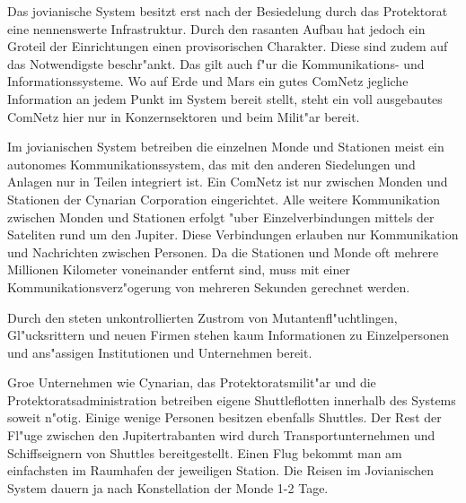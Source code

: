 
Das jovianische System besitzt erst nach der Besiedelung durch das Protektorat eine nennenswerte Infrastruktur. Durch den rasanten Aufbau hat jedoch ein Gro\3teil der Einrichtungen einen provisorischen Charakter. Diese sind zudem auf das Notwendigste beschr"ankt. Das gilt auch f"ur die Kommunikations- und Informationssysteme. Wo auf Erde und Mars ein gutes ComNetz jegliche Information an jedem Punkt im System bereit stellt, steht ein voll ausgebautes ComNetz hier nur in Konzernsektoren und beim Milit"ar bereit.

Im jovianischen System  betreiben die einzelnen Monde und Stationen meist ein autonomes Kommunikationssystem, das mit den anderen Siedelungen und Anlagen nur in Teilen integriert ist. Ein ComNetz ist nur zwischen Monden und Stationen der Cynarian Corporation eingerichtet. Alle weitere Kommunikation zwischen Monden und Stationen erfolgt "uber Einzelverbindungen mittels der Sateliten rund um den Jupiter. Diese Verbindungen erlauben nur Kommunikation und Nachrichten zwischen Personen. Da die Stationen und Monde oft mehrere Millionen Kilometer voneinander entfernt sind, muss mit einer Kommunikationsverz"ogerung von mehreren Sekunden gerechnet werden.

Durch den steten unkontrollierten Zustrom von Mutantenfl"uchtlingen, Gl"ucksrittern und neuen Firmen stehen kaum Informationen zu Einzelpersonen und ans"assigen Institutionen und Unternehmen bereit.


Gro\3e Unternehmen wie Cynarian, das Protektoratsmilit"ar und die Protektoratsadministration betreiben eigene Shuttleflotten innerhalb des Systems soweit n"otig. Einige wenige Personen besitzen ebenfalls Shuttles. Der Rest der Fl"uge zwischen den Jupitertrabanten wird durch Transportunternehmen und Schiffseignern von Shuttles bereitgestellt. Einen Flug bekommt man am einfachsten im Raumhafen der jeweiligen Station. Die Reisen im Jovianischen System dauern ja nach Konstellation der Monde 1-2 Tage.
